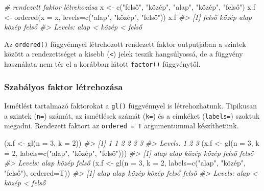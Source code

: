 \documentclass[
]{book}
\newenvironment{Shaded}{\begin{snugshade}}{\end{snugshade}}
\newcommand{\AttributeTok}[1]{\textcolor[rgb]{0.77,0.63,0.00}{#1}}
\newcommand{\CommentTok}[1]{\textcolor[rgb]{0.56,0.35,0.01}{\textit{#1}}}
\newcommand{\DecValTok}[1]{\textcolor[rgb]{0.00,0.00,0.81}{#1}}
\newcommand{\FunctionTok}[1]{\textcolor[rgb]{0.00,0.00,0.00}{#1}}
\newcommand{\NormalTok}[1]{#1}
\newcommand{\OtherTok}[1]{\textcolor[rgb]{0.56,0.35,0.01}{#1}}
\newcommand{\StringTok}[1]{\textcolor[rgb]{0.31,0.60,0.02}{#1}}
\begin{document}
\begin{Shaded}
\begin{Highlighting}[]
\CommentTok{\# rendezett faktor létrehozása}
\NormalTok{x }\OtherTok{\textless{}{-}} \FunctionTok{c}\NormalTok{(}\StringTok{"felső"}\NormalTok{, }\StringTok{"közép"}\NormalTok{, }\StringTok{"alap"}\NormalTok{, }\StringTok{"közép"}\NormalTok{, }\StringTok{"felső"}\NormalTok{)}
\NormalTok{x.f }\OtherTok{\textless{}{-}} \FunctionTok{ordered}\NormalTok{(}\AttributeTok{x =}\NormalTok{ x, }\AttributeTok{levels=}\FunctionTok{c}\NormalTok{(}\StringTok{"alap"}\NormalTok{, }\StringTok{"közép"}\NormalTok{, }\StringTok{"felső"}\NormalTok{))}
\NormalTok{x.f}
\CommentTok{\#\textgreater{} [1] felső közép alap  közép felső}
\CommentTok{\#\textgreater{} Levels: alap \textless{} közép \textless{} felső}
\end{Highlighting}
\end{Shaded}

Az \texttt{ordered()} függvénnyel létrehozott rendezett faktor outputjában a szintek között a rendezettséget a kisebb (\texttt{\textless{}}) jelek teszik hangsúlyossá, de a függvény használata nem tér el a korábban látott \texttt{factor()} függvénytől.

\hypertarget{szabuxe1lyos-faktor-luxe9trehozuxe1sa}{%
\subsubsection{Szabályos faktor létrehozása}\label{szabuxe1lyos-faktor-luxe9trehozuxe1sa}}

Ismétlést tartalmazó faktorokat a \texttt{gl()} függvénnyel is létrehozhatunk. Tipikusan a szintek (\texttt{n=}) számát, az ismétlések számát (\texttt{k=}) és a címkéket (\texttt{labels=}) szoktuk megadni. Rendezett faktort az \texttt{ordered\ =\ T} argumentummal készíthetünk.

\begin{Shaded}
\begin{Highlighting}[]
\NormalTok{(x.f }\OtherTok{\textless{}{-}} \FunctionTok{gl}\NormalTok{(}\AttributeTok{n =} \DecValTok{3}\NormalTok{, }\AttributeTok{k =} \DecValTok{2}\NormalTok{))}
\CommentTok{\#\textgreater{} [1] 1 1 2 2 3 3}
\CommentTok{\#\textgreater{} Levels: 1 2 3}
\NormalTok{(x.f }\OtherTok{\textless{}{-}} \FunctionTok{gl}\NormalTok{(}\AttributeTok{n =} \DecValTok{3}\NormalTok{, }\AttributeTok{k =} \DecValTok{2}\NormalTok{, }\AttributeTok{labels=}\FunctionTok{c}\NormalTok{(}\StringTok{"alap"}\NormalTok{, }\StringTok{"közép"}\NormalTok{, }\StringTok{"felső"}\NormalTok{)))}
\CommentTok{\#\textgreater{} [1] alap  alap  közép közép felső felső}
\CommentTok{\#\textgreater{} Levels: alap közép felső}
\NormalTok{(x.f }\OtherTok{\textless{}{-}} \FunctionTok{gl}\NormalTok{(}\AttributeTok{n =} \DecValTok{3}\NormalTok{, }\AttributeTok{k =} \DecValTok{2}\NormalTok{, }\AttributeTok{labels=}\FunctionTok{c}\NormalTok{(}\StringTok{"alap"}\NormalTok{, }\StringTok{"közép"}\NormalTok{, }\StringTok{"felső"}\NormalTok{), }\AttributeTok{ordered=}\NormalTok{T))}
\CommentTok{\#\textgreater{} [1] alap  alap  közép közép felső felső}
\CommentTok{\#\textgreater{} Levels: alap \textless{} közép \textless{} felső}
\end{Highlighting}
\end{Shaded}
\end{document}
